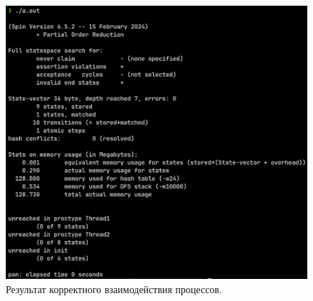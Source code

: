\begin{figure}[H]
	\centering
	\includegraphics[width=\textwidth]{inc/4.png}
	\caption{ Результат корректного взаимодействия процессов. }
	\label{img:4}
\end{figure}

\pagebreak
